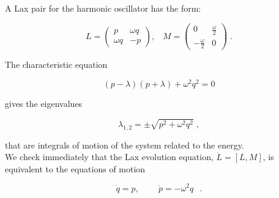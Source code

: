 \begin{example}
A Lax pair for the harmonic oscillator has the form:

\[L = 
\begin{pmatrix}   
p & \omega q\\   
\omega q & -p  
\end{pmatrix},\;\;\;
M = 
\begin{pmatrix}   
0 & \frac{\omega}{2}\\   
-\frac{\omega}{2} & 0  
\end{pmatrix}\;.\]

The characteristic equation

\begin{equation}
    (p-\lambda) (p + \lambda) + \omega^2 q^2 = 0
\end{equation}

gives the eigenvalues

\begin{equation}
    \lambda_{1,2} = \pm \sqrt{p^2 + \omega^2 q^2}\;,
\end{equation}

that are integrals of motion of the system related to the energy. \\
We check immediately that the Lax evolution equation, $\dot L = [L, M]$, is equivalent to the equations of motion

\[\dot q = p, \;\;\;\;\;\;\;\;\dot p = -\omega^2 q\;\;\,.\]
\end{example}